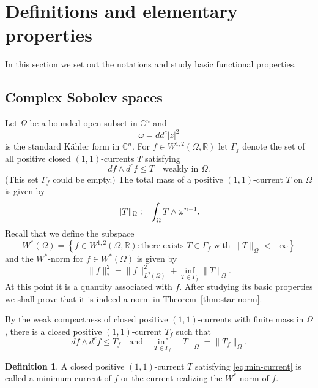 \documentclass{amsart}
\newcommand{\om}{\omega}
\newcommand{\Ga}{\Gamma}
\newcommand{\Om}{\Omega}
\newcommand{\bR}{\mathbb{R}}
\newcommand{\bC}{\mathbb{C}}
\theoremstyle{definition}
\newtheorem{defn}[thm]{Definition}
\numberwithin{thm}{section}
\numberwithin{equation}{section}
\renewcommand{\[}{\begin{equation}}
\renewcommand{\]}{\end{equation}}
\newcommand{\wed}{\wedge}
\begin{document}
\section{Definitions and elementary properties}

In this section we set out the notations and study basic functional properties.

\subsection{Complex Sobolev spaces}

Let $\Om$ be a bounded open subset in $\bC^n$ and $$\om = dd^c |z|^2$$ is the standard K\"ahler form in $\bC^n$. For $f\in W^{1,2}(\Om, \bR)$ let $\Ga_f$ denote the set of all positive closed $(1,1)$-currents $T$ satisfying
\[\label{eq:test-currents}
	df \wed d^c f \leq T \quad\text{weakly in } \Om.
\]
(This set $\Ga_f$ could be empty.) 
The total mass of a positive $(1,1)$-current $T$ on $\Om$ is given by
\[\notag
	 \|T \|_\Om := \int_\Om T \wed \om^{n-1}.
\]
Recall that we define the subspace 
\[ \label{eq:sobolev-space}
W^*(\Om)= \left\{f \in W^{1,2}(\Om,\bR):   \text{there exists $T\in \Ga_f$ with } \|T\|_\Om <+\infty
\right\}
\]
and  the $W^*$-norm for $f \in W^*(\Om)$ is given by
\[\label{eq:norm}
	\|f\|_*^2 = \| f\|_{L^2(\Om)}^2 + \inf_{T\in \Ga_f} \|T\|_{\Om}.
\]
At this point it is a quantity associated with  $f$.  After  studying its basic properties we shall  prove that it is indeed a norm in Theorem~\ref{thm:star-norm}.

By the weak compactness of closed positive $(1,1)$-currents with finite mass in $\Om$, there is a closed positive $(1,1)$-current $T_f$ such that 
\[ \label{eq:min-current}
	df \wed d^c f \leq T_f \quad\mbox{and}\quad \inf_{T \in \Ga_f} \|T\|_\Om = \|T_f\|_\Om.
\] 

\begin{defn} \label{defn:w-current} A closed positive $(1,1)$-current $T$ satisfying \eqref{eq:min-current} is called a minimum current of $f$ or the current realizing the $W^*$-norm of $f$.
\end{defn}
\end{document}
